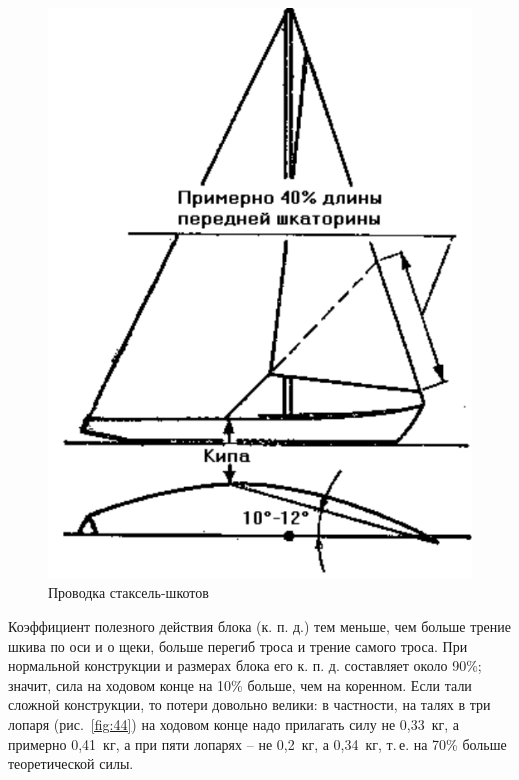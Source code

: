 \documentclass[a4paper, 12pt, twoside, final]{scrbook}
\begin{document}
\begin{figure}%
\begin{centering}
\includegraphics{Provodka_staksel-shkotov}
\par\end{centering}

\protect\caption{\label{fig:46}Проводка стаксель-шкотов}

\end{figure}%


Коэффициент полезного действия блока (к. п. д.) тем меньше, чем больше
трение шкива по оси и о щеки, больше перегиб троса и трение самого
троса. При нормальной конструкции и размерах блока его к. п. д. составляет
около 90\%; значит, сила на ходовом конце на 10\% больше, чем на коренном.
Если тали сложной конструкции, то потери довольно велики: в частности,
на талях в три лопаря (рис.~\ref{fig:44})
на ходовом конце надо прилагать силу не 0,33~кг, а примерно 0,41~кг,
а при пяти лопарях \--- не 0,2~кг, а 0,34~кг, т.\,е. на 70\% больше теоретической
силы.
\end{document}
